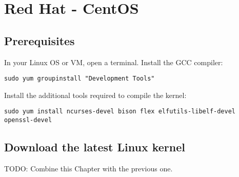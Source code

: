 \documentclass[12pt,a4paper]{report}
\begin{document}
\chapter{Red Hat - CentOS}

\section{Prerequisites}
In your Linux OS or VM, open a terminal. Install the GCC compiler:
\newline
\newline
\centerline{\texttt{sudo yum groupinstall "Development Tools"}}
\newline
\newline 
Install the additional tools required to compile the kernel:
\newline
\newline
\centerline{\texttt{\scriptsize sudo yum install ncurses-devel bison flex elfutils-libelf-devel openssl-devel}}


\section{Download the latest Linux kernel}
TODO: Combine this Chapter with the previous one.
\end{document}
